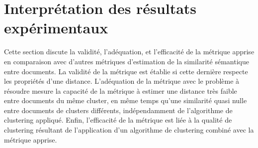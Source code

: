 
\section{Interprétation des résultats expérimentaux}
\label{sec:similarite:experimentations}
Cette section discute la validité, l'adéquation, et l'efficacité de la métrique apprise en comparaison avec d'autres métriques d'estimation de la similarité sémantique entre documents. La validité de la métrique est établie si cette dernière respecte les propriétés d'une distance. L'adéquation de la métrique avec le problème à résoudre mesure la capacité de la métrique à estimer une distance très faible entre documents du même cluster, en même temps qu'une similarité quasi nulle entre documents de clusters différents, indépendamment de l'algorithme de clustering appliqué. Enfin, l'efficacité de la métrique est liée à la qualité de clustering résultant de l'application d'un algorithme de clustering combiné avec la métrique apprise.



